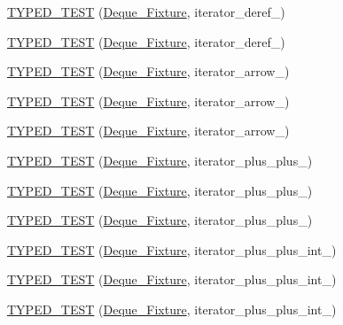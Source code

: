 \begin{DoxyCompactItemize}
\item 
\hyperlink{TestDeque_8c_09_09_ac565f99e1e2258dbcd092fa9359eb07c}{T\-Y\-P\-E\-D\-\_\-\-T\-E\-S\-T} (\hyperlink{structDeque__Fixture}{Deque\-\_\-\-Fixture}, iterator\-\_\-deref\-\_)
\item 
\hyperlink{TestDeque_8c_09_09_a1534e7d90f8191c0b36fcfd70cf20a8c}{T\-Y\-P\-E\-D\-\_\-\-T\-E\-S\-T} (\hyperlink{structDeque__Fixture}{Deque\-\_\-\-Fixture}, iterator\-\_\-deref\-\_)
\item 
\hyperlink{TestDeque_8c_09_09_a694fd163283a639ac0b54768db2947c2}{T\-Y\-P\-E\-D\-\_\-\-T\-E\-S\-T} (\hyperlink{structDeque__Fixture}{Deque\-\_\-\-Fixture}, iterator\-\_\-arrow\-\_)
\item 
\hyperlink{TestDeque_8c_09_09_a9e922ee1c60e550564daac2bb1041968}{T\-Y\-P\-E\-D\-\_\-\-T\-E\-S\-T} (\hyperlink{structDeque__Fixture}{Deque\-\_\-\-Fixture}, iterator\-\_\-arrow\-\_)
\item 
\hyperlink{TestDeque_8c_09_09_a5a77ae18231a274216da19e6446e936f}{T\-Y\-P\-E\-D\-\_\-\-T\-E\-S\-T} (\hyperlink{structDeque__Fixture}{Deque\-\_\-\-Fixture}, iterator\-\_\-arrow\-\_)
\item 
\hyperlink{TestDeque_8c_09_09_aeec4c12cf4c313cc035cc9468ac51f55}{T\-Y\-P\-E\-D\-\_\-\-T\-E\-S\-T} (\hyperlink{structDeque__Fixture}{Deque\-\_\-\-Fixture}, iterator\-\_\-plus\-\_\-plus\-\_)
\item 
\hyperlink{TestDeque_8c_09_09_acaa190c9d0359ee0134d70585259f700}{T\-Y\-P\-E\-D\-\_\-\-T\-E\-S\-T} (\hyperlink{structDeque__Fixture}{Deque\-\_\-\-Fixture}, iterator\-\_\-plus\-\_\-plus\-\_)
\item 
\hyperlink{TestDeque_8c_09_09_a995366baf26d9bef407b3de1a40507e4}{T\-Y\-P\-E\-D\-\_\-\-T\-E\-S\-T} (\hyperlink{structDeque__Fixture}{Deque\-\_\-\-Fixture}, iterator\-\_\-plus\-\_\-plus\-\_)
\item 
\hyperlink{TestDeque_8c_09_09_a751b166a1c1e6c30b3bfd2dd71523a45}{T\-Y\-P\-E\-D\-\_\-\-T\-E\-S\-T} (\hyperlink{structDeque__Fixture}{Deque\-\_\-\-Fixture}, iterator\-\_\-plus\-\_\-plus\-\_\-int\-\_)
\item 
\hyperlink{TestDeque_8c_09_09_a3be1571906679319181ab0765d1afc70}{T\-Y\-P\-E\-D\-\_\-\-T\-E\-S\-T} (\hyperlink{structDeque__Fixture}{Deque\-\_\-\-Fixture}, iterator\-\_\-plus\-\_\-plus\-\_\-int\-\_)
\item 
\hyperlink{TestDeque_8c_09_09_ac6d0d6d0be55dc1c98c8b53d707d6896}{T\-Y\-P\-E\-D\-\_\-\-T\-E\-S\-T} (\hyperlink{structDeque__Fixture}{Deque\-\_\-\-Fixture}, iterator\-\_\-plus\-\_\-plus\-\_\-int\-\_)

\end{DoxyCompactItemize}
